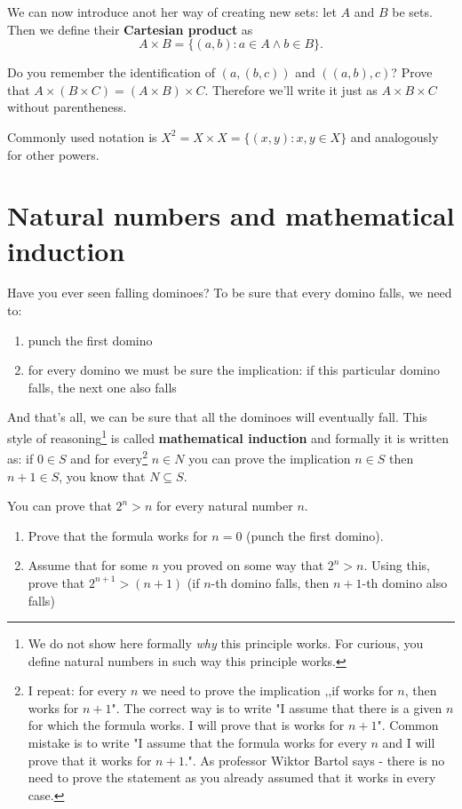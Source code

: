 \noindent We can now introduce anot
her way of creating new sets: let $A$ and $B$ be sets. Then we define their
\textbf{Cartesian product} as 
$$A\times B = \{(a,b) : a\in A\wedge b\in B\}.$$

\begin{prob}
	Do you remember the identification of $(a,(b,c))$ and $((a,b),c)$? Prove that
	$A\times (B\times C) = (A\times B)\times C$. Therefore we'll write it just as $A\times B\times C$ 
	without parentheness.
\end{prob}

\noindent Commonly used notation is $X^2 = X\times X = \{(x,y) : x, y \in X\}$ and analogously for other powers.

\section{Natural numbers and mathematical induction}
\label{sec:mathematical_induction}
Have you ever seen falling dominoes? To be sure that every domino falls, we need to:
\begin{enumerate}
	\item punch the first domino
	\item for every domino we must be sure the implication: if this particular domino falls, the next one also falls
\end{enumerate}
And that's all, we can be sure that all the dominoes will eventually fall. This style of reasoning\footnote{We do not show here formally \textit{why}
this principle works. For curious, you define natural numbers in such way this principle works.} is called \textbf{mathematical induction} and
formally it is written as: if $0\in S$ and for every\footnote{I repeat: for every $n$ we need to prove the implication ,,if works for $n$, then
works for $n+1$". The correct way is to write "I assume that there is a given $n$ for which the formula works. I will prove that is works for $n+1$".
Common mistake is to write "I assume that the formula works for every $n$ and I will prove that it works for $n+1$.". As professor Wiktor Bartol says 
- there is no need to prove the statement as you already assumed that it works in every case.}
 $n\in N$ you can prove the implication $n\in S$ then $n+1\in S$, you know that $N\subseteq S$.
\begin{prob}
	You can prove that $2^n>n$ for every natural number $n$. 
	\begin{enumerate}
		\item Prove that the formula works for $n=0$ (punch the first domino).
		\item Assume that for some $n$ you proved on some way that $2^n>n$. Using this, prove that $2^{n+1}>(n+1)$ (if $n$-th domino falls, then
		$n+1$-th domino also falls)
	\end{enumerate}
\end{prob}

